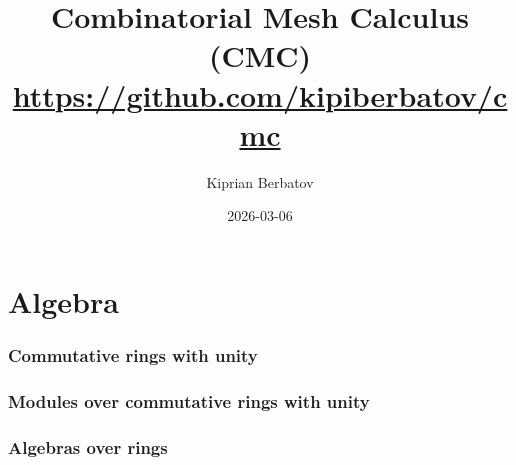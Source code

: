 \documentclass{article}
\title{Combinatorial Mesh Calculus (CMC) \\
       \url{https://github.com/kipiberbatov/cmc}}
\author{Kiprian Berbatov}
\date{2026-03-06}
\theoremstyle{definition}
\begin{document}

\maketitle

\tableofcontents
\NewCommandCopy\oricontentsline\contentsline
\makeatletter
\RenewDocumentCommand{}
{%
  {\let\numberline\@gobble
    }%
}
\makeatother

\listoffigures

\listoftables


\part{Algebra}

\section{Commutative rings with unity}
\label{section:commutative_rings_with_unity}









\section{Modules over commutative rings with unity}
\label{section:modules_over_commutative_rings_with_unity}












\section{Algebras over rings}
\label{section:algebras_over_rings}




\end{document}
